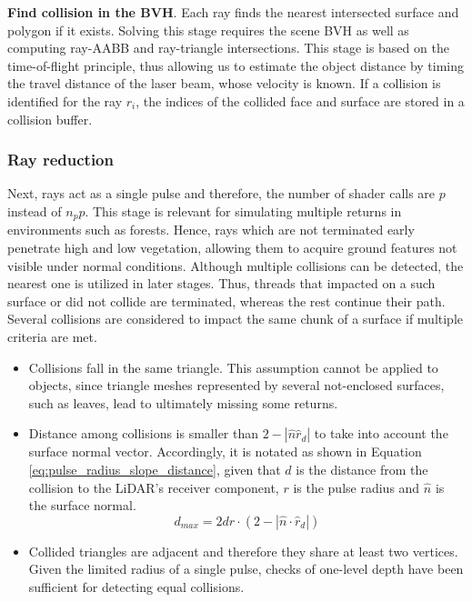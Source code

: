 \textbf{Find collision in the BVH}. Each ray finds the nearest intersected surface and polygon if it exists. Solving this stage requires the scene BVH as well as computing ray-AABB and ray-triangle intersections. This stage is based on the time-of-flight principle, thus allowing us to estimate the object distance by timing the travel distance of the laser beam, whose velocity is known. If a collision is identified for the ray $r_{i}$, the indices of the collided face and surface are stored in a collision buffer. 

\subsubsection{Ray reduction}

Next, rays act as a single pulse and therefore, the number of shader calls are $p$ instead of $n_{p}p$. This stage is relevant for simulating multiple returns in environments such as forests. Hence, rays which are not terminated early penetrate high and low vegetation, allowing them to acquire ground features not visible under normal conditions. Although multiple collisions can be detected, the nearest one is utilized in later stages. Thus, threads that impacted on a such surface or did not collide are terminated, whereas the rest continue their path. Several collisions are considered to impact the same chunk of a surface if multiple criteria are met. 
\begin{itemize}
    \item Collisions fall in the same triangle. This assumption cannot be applied to objects, since triangle meshes represented by several not-enclosed surfaces, such as leaves, lead to ultimately missing some returns.
    \item Distance among collisions is smaller than $2 - \left|\hat{n} \hat{r}_{d}\right|$ to take into account the surface normal vector. Accordingly, it is notated as shown in Equation \ref{eq:pulse_radius_slope_distance}, given that $d$ is the distance from the collision to the LiDAR's receiver component, $r$ is the pulse radius and $\hat{n}$ is the surface normal.
    \begin{equation}
        \label{eq:pulse_radius_slope_distance}
        d_{\textit{max}} = 2dr \cdot (2 - \left|\hat{n} \cdot \hat{r}_{d}\right|)
    \end{equation}
    \item Collided triangles are adjacent and therefore they share at least two vertices. Given the limited radius of a single pulse, checks of one-level depth have been sufficient for detecting equal collisions.
\end{itemize}

